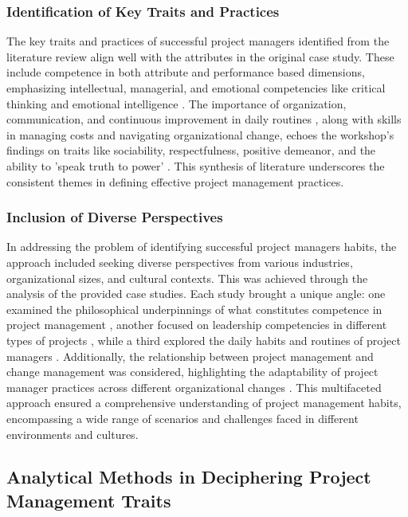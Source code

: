 \documentclass{article}
\begin{document}
\subsubsection{Identification of Key Traits and Practices} 

The key traits and practices of successful project managers identified from the literature review align well with the attributes in the original case study. These include competence in both attribute and performance based dimensions, emphasizing intellectual, managerial, and emotional competencies like critical thinking and emotional intelligence \cite{muller2010leadership}. The importance of organization, communication, and continuous improvement in daily routines \cite{sigurdhssonpatterns}, along with skills in managing costs and navigating organizational change, echoes the workshop's findings on traits like sociability, respectfulness, positive demeanor, and the ability to 'speak truth to power' \cite{bredillet2015good}. This synthesis of literature underscores the consistent themes in defining effective project management practices.

\subsubsection{Inclusion of Diverse Perspectives}

In addressing the problem of identifying successful project managers habits, the approach included seeking diverse perspectives from various industries, organizational sizes, and cultural contexts. This was achieved through the analysis of the provided case studies. Each study brought a unique angle: one examined the philosophical underpinnings of what constitutes competence in project management \cite{bredillet2015good}, another focused on leadership competencies in different types of projects \cite{muller2010leadership}, while a third explored the daily habits and routines of project managers \cite{sigurdhssonpatterns}. Additionally, the relationship between project management and change management was considered, highlighting the adaptability of project manager practices across different organizational changes \cite{pollack2016project}. This multifaceted approach ensured a comprehensive understanding of project management habits, encompassing a wide range of scenarios and challenges faced in different environments and cultures.

\subsection{Analytical Methods in Deciphering Project Management Traits}
\end{document}
